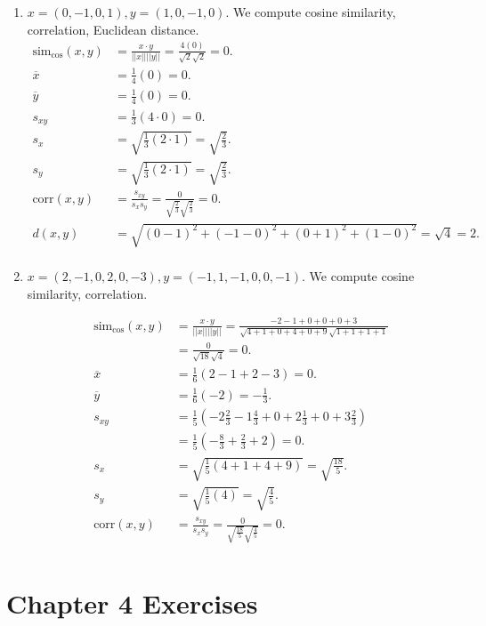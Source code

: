 \documentclass[12pt,oneside,reqno]{amsart}
\theoremstyle{plain}
\theoremstyle{definition}
\theoremstyle{remark}
\newcommand{\bb}{\vspace{3mm}}
\newcommand{\bee}{\begin{equation}\begin{aligned}}
\newcommand{\eee}{\end{aligned}\end{equation}}
\newcommand{\fracc}{\frac}
\renewcommand{\bar}{\overline}%
\begin{document}
\begin{enumerate}[label=\arabic*.]
\begin{enumerate}
\item $x = (0,-1,0,1), y = (1,0,-1,0)$. We compute cosine similarity, correlation, Euclidean distance.
\bee
\text{sim}_{\cos}(x,y) &= \fracc{x \cdot y}{||x||||y||} = \fracc{4(0)}{\sqrt{2}\sqrt{2}}  = 0.\\
\bar{x} &= \fracc{1}{4}(0) = 0.\\
\bar{y} &= \fracc{1}{4}(0)= 0. \\
s_{xy} &= \fracc{1}{3}(4 \cdot 0) = 0.\\
s_x &= \sqrt{\fracc{1}{3}(2 \cdot 1)} =\sqrt{ \fracc{2}{3}}.\\
s_y &= \sqrt{\fracc{1}{3}(2 \cdot 1)} =\sqrt{ \fracc{2}{3}}.\\
\text{corr}(x,y) &= \fracc{s_{xy}}{s_x s_y} = \fracc{0}{\sqrt{ \fracc{2}{3}}\sqrt{ \fracc{2}{3}}} = 0.\\
d(x,y) &= \sqrt{(0 - 1)^2 +(-1 - 0)^2 +(0 + 1)^2 +(1 - 0)^2} = \sqrt{4}= 2. \\
\eee

\bb\bb\bb\bb\bb\bb

\item $x = (2,-1,0,2,0,-3), y = (-1,1,-1,0,0,-1)$. We compute cosine similarity, correlation. 

\bee
\text{sim}_{\cos}(x,y) &= \fracc{x \cdot y}{||x||||y||} = \fracc{-2 - 1 + 0 + 0 + 0 + 3}{\sqrt{4 + 1 + 0 + 4 + 0 + 9}\sqrt{1 + 1 + 1 + 1}}\\
 &= \fracc{0}{\sqrt{18}\sqrt{4}} = 0.\\
\bar{x} &= \fracc{1}{6}(2 - 1 + 2 - 3) = 0.\\
\bar{y} &= \fracc{1}{6}(-2)=-\fracc{1}{3}. \\
s_{xy} &= \fracc{1}{5}(-2\fracc{2}{3} - 1\fracc{4}{3} + 0 + 2\fracc{1}{3} + 0 + 3\fracc{2}{3})\\
&= \fracc{1}{5}(-\fracc{8}{3} + \fracc{2}{3} + 2) = 0.\\
s_x &= \sqrt{\fracc{1}{5}(4 + 1 + 4 + 9)} =\sqrt{ \fracc{18}{5}}.\\
s_y &= \sqrt{\fracc{1}{5}(4)} =\sqrt{ \fracc{4}{5}}.\\
\text{corr}(x,y) &= \fracc{s_{xy}}{s_x s_y} = \fracc{0}{\sqrt{ \fracc{18}{5}}\sqrt{ \fracc{4}{5}}} = 0.\\
\eee


\end{enumerate}
\end{enumerate}

\bb\bb
\section*{Chapter 4 Exercises}
\end{document}
